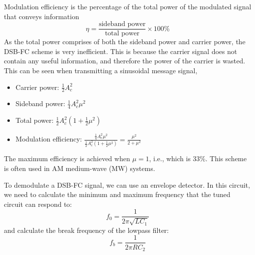 \documentclass{article}
\begin{document}
Modulation efficiency is the percentage of the total power of the modulated signal that conveys information
\begin{equation*}
    \eta = \frac{\text{sideband power}}{\text{total power}} \times 100\%
\end{equation*}
As the total power comprises of both the sideband power and carrier power, the DSB-FC scheme is very inefficient.
This is because the carrier signal does not contain any useful information, and therefore the power of the carrier is wasted.
This can be seen when transmitting a sinusoidal message signal,
\begin{itemize}
    \item Carrier power: \(\frac{1}{2} A_c^2\)
    \item Sideband power: \(\frac{1}{4} A_c^2 \mu^2\)
    \item Total power: \(\frac{1}{2} A_c^2 \left( 1 + \frac{1}{2}\mu^2 \right)\)
    \item Modulation efficiency: \(\frac{\frac{1}{4} A_c^2 \mu^2}{\frac{1}{2} A_c^2 \left( 1 + \frac{1}{2}\mu^2 \right)} = \frac{\mu^2}{2 + \mu^2}\)
\end{itemize}
The maximum efficiency is achieved when \(\mu = 1\), i.e., which is \(33\%\).
This scheme is often used in AM medium-wave (MW) systems.

To demodulate a DSB-FC signal, we can use an envelope detector.
In this circuit, we need to calculate the minimum and maximum frequency that the tuned circuit can
respond to:
\begin{equation*}
    f_0 = \frac{1}{2 \pi \sqrt{LC_1}}
\end{equation*}
and calculate the break frequency of the lowpass filter:
\begin{equation*}
    f_b = \frac{1}{2 \pi R C_2}
\end{equation*}
\end{document}
